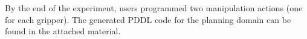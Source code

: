 %
By the end of the experiment, users programmed two manipulation actions (one for each gripper).
The generated PDDL code for the planning domain can be found in the attached material.





